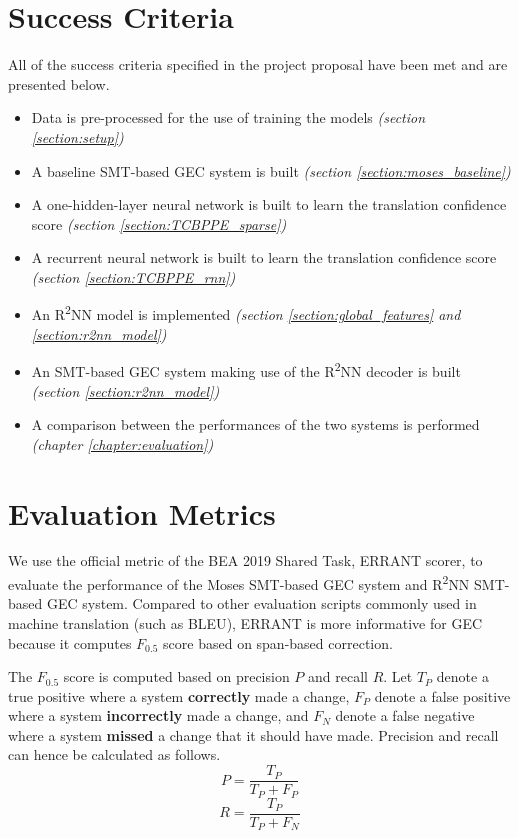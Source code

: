 \documentclass[12pt,a4paper,twoside,openright]{report}
\begin{document}
\section{Success Criteria}\label{section:success_criteria}
All of the success criteria specified in the project proposal have been met and are presented below.
\begin{itemize}
    \item[\checkmark] Data is pre-processed for the use of training the models \textit{(section \ref{section:setup})}
    \item[\checkmark] A baseline SMT-based GEC system is built \textit{(section \ref{section:moses_baseline})}
    \item[\checkmark] A one-hidden-layer neural network is built to learn the translation confidence score \textit{(section \ref{section:TCBPPE_sparse})}
    \item[\checkmark] A recurrent neural network is built to learn the translation confidence score \textit{(section \ref{section:TCBPPE_rnn})}
    \item[\checkmark] An R\textsuperscript{2}NN model is implemented \textit{(section \ref{section:global_features} and \ref{section:r2nn_model})}
    \item[\checkmark] An SMT-based GEC system making use of the R\textsuperscript{2}NN decoder is built \textit{(section \ref{section:r2nn_model})}
    \item[\checkmark] A comparison between the performances of the two systems is performed \textit{(chapter \ref{chapter:evaluation})}
\end{itemize}

\section{Evaluation Metrics}
We use the official metric of the BEA 2019 Shared Task\cite{bryant-etal-2019-bea}, ERRANT scorer\cite{bryant-etal-2017-automatic}\cite{felice-etal-2016-automatic}, to evaluate the performance of the Moses SMT-based GEC system and R\textsuperscript{2}NN SMT-based GEC system. Compared to other evaluation scripts commonly used in machine translation (such as BLEU\cite{10.3115/1073083.1073135}), ERRANT is more informative for GEC because it computes $F_{0.5}$ score based on span-based correction.

The $F_{0.5}$ score is computed based on precision $P$ and recall $R$. Let $T_P$ denote a true positive where a system \textbf{correctly} made a change, $F_P$ denote a false positive where a system \textbf{incorrectly} made a change, and $F_N$ denote a false negative where a system \textbf{missed} a change that it should have made. Precision and recall can hence be calculated as follows.
\[P = \frac{T_P}{T_P+F_P}\]
\[R = \frac{T_P}{T_P+F_N}\]
\end{document}
